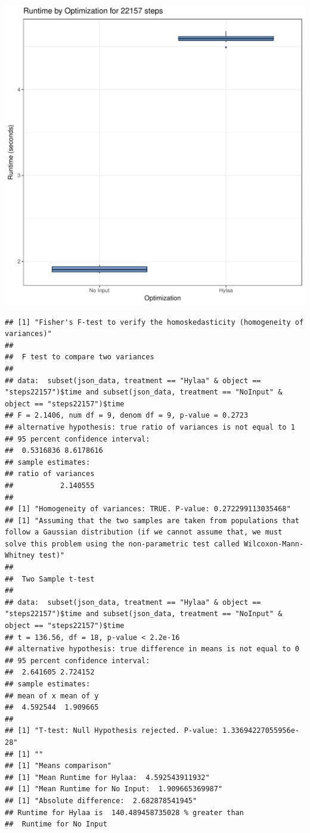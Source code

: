 \documentclass{article}\usepackage[]{graphicx}\usepackage[]{color}
\makeatletter
\def\maxwidth{ %
  \ifdim\Gin@nat@width>\linewidth
    \linewidth
  \else
    \Gin@nat@width
  \fi
}
\newenvironment{kframe}{%
 \def\at@end@of@kframe{}%
 \ifinner\ifhmode%
  \def\at@end@of@kframe{\end{minipage}}%
  \begin{minipage}{\columnwidth}%
 \fi\fi%
 \def\FrameCommand##1{\hskip\@totalleftmargin \hskip-\fboxsep
 \colorbox{shadecolor}{##1}\hskip-\fboxsep
     \hskip-\linewidth \hskip-\@totalleftmargin \hskip\columnwidth}%
 \MakeFramed {\advance\hsize-\width
   \@totalleftmargin\z@ \linewidth\hsize
   \@setminipage}}%
 {\par\unskip\endMakeFramed%
 \at@end@of@kframe}
\newenvironment{knitrout}{}{} %
\makeatother
\begin{document}
\begin{knitrout}
\color{fgcolor}
\includegraphics[width=\maxwidth]{figure/RH4_steps22157-1} 
\begin{kframe}\begin{verbatim}
## [1] "Fisher's F-test to verify the homoskedasticity (homogeneity of variances)"
## 
## 	F test to compare two variances
## 
## data:  subset(json_data, treatment == "Hylaa" & object == "steps22157")$time and subset(json_data, treatment == "NoInput" & object == "steps22157")$time
## F = 2.1406, num df = 9, denom df = 9, p-value = 0.2723
## alternative hypothesis: true ratio of variances is not equal to 1
## 95 percent confidence interval:
##  0.5316836 8.6178616
## sample estimates:
## ratio of variances 
##           2.140555 
## 
## [1] "Homogeneity of variances: TRUE. P-value: 0.272299113035468"
## [1] "Assuming that the two samples are taken from populations that follow a Gaussian distribution (if we cannot assume that, we must solve this problem using the non-parametric test called Wilcoxon-Mann-Whitney test)"
## 
## 	Two Sample t-test
## 
## data:  subset(json_data, treatment == "Hylaa" & object == "steps22157")$time and subset(json_data, treatment == "NoInput" & object == "steps22157")$time
## t = 136.56, df = 18, p-value < 2.2e-16
## alternative hypothesis: true difference in means is not equal to 0
## 95 percent confidence interval:
##  2.641605 2.724152
## sample estimates:
## mean of x mean of y 
##  4.592544  1.909665 
## 
## [1] "T-test: Null Hypothesis rejected. P-value: 1.33694227055956e-28"
## [1] ""
## [1] "Means comparison"
## [1] "Mean Runtime for Hylaa:  4.592543911932"
## [1] "Mean Runtime for No Input:  1.909665369987"
## [1] "Absolute difference:  2.682878541945"
## Runtime for Hylaa is  140.489458735028 % greater than 
##  Runtime for No Input
\end{verbatim}
\end{kframe}
\end{knitrout}
\end{document}

